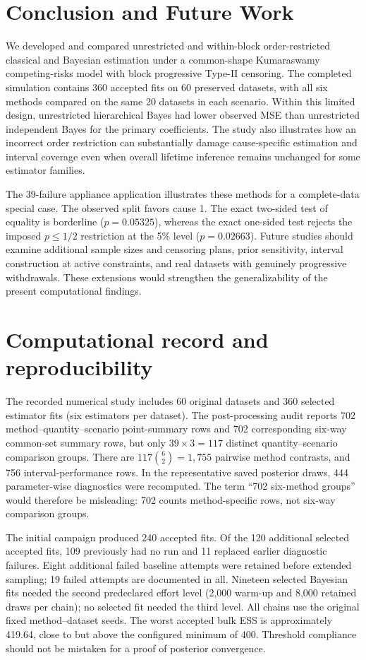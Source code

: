 \documentclass[a4paper,11pt]{article}
\begin{document}
\section{Conclusion and Future Work}\label{sec:conclusion}
We developed and compared unrestricted and within-block order-restricted classical and Bayesian estimation under a common-shape Kumaraswamy competing-risks model with block progressive Type-II censoring. The completed simulation contains 360 accepted fits on 60 preserved datasets, with all six methods compared on the same 20 datasets in each scenario. Within this limited design, unrestricted hierarchical Bayes had lower observed MSE than unrestricted independent Bayes for the primary coefficients. The study also illustrates how an incorrect order restriction can substantially damage cause-specific estimation and interval coverage even when overall lifetime inference remains unchanged for some estimator families.

The 39-failure appliance application illustrates these methods for a complete-data special case. The observed split favors cause 1. The exact two-sided test of equality is borderline ($p=0.05325$), whereas the exact one-sided test rejects the imposed $p\le1/2$ restriction at the 5\% level ($p=0.02663$). Future studies should examine additional sample sizes and censoring plans, prior sensitivity, interval construction at active constraints, and real datasets with genuinely progressive withdrawals. These extensions would strengthen the generalizability of the present computational findings.

\appendix
\section{Computational record and reproducibility}\label{app:repro}
The recorded numerical study includes 60 original datasets and 360 selected estimator fits (six estimators per dataset). The post-processing audit reports 702 method--quantity--scenario point-summary rows and 702 corresponding six-way common-set summary rows, but only $39\times3=117$ distinct quantity--scenario comparison groups. There are $117\binom{6}{2}=1{,}755$ pairwise method contrasts, and 756 interval-performance rows. In the representative saved posterior draws, 444 parameter-wise diagnostics were recomputed. The term ``702 six-method groups'' would therefore be misleading: 702 counts method-specific rows, not six-way comparison groups.

The initial campaign produced 240 accepted fits. Of the 120 additional selected accepted fits, 109 previously had no run and 11 replaced earlier diagnostic failures. Eight additional failed baseline attempts were retained before extended sampling; 19 failed attempts are documented in all. Nineteen selected Bayesian fits needed the second predeclared effort level (2,000 warm-up and 8,000 retained draws per chain); no selected fit needed the third level. All chains use the original fixed method--dataset seeds. The worst accepted bulk ESS is approximately 419.64, close to but above the configured minimum of 400. Threshold compliance should not be mistaken for a proof of posterior convergence.
\end{document}
